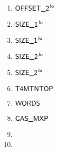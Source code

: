 \begin{description}
\begin{multicols}{3}
\begin{enumerate}
				\item $\textsf{OFFSET}\textsf{\_2}^{\mathsf{\,lo}}$
				\item $\textsf{SIZE}\textsf{\_1}^{\mathsf{\,hi}}$
				\item $\textsf{SIZE}\textsf{\_1}^{\mathsf{\,lo}}$
				\item $\textsf{SIZE}\textsf{\_2}^{\mathsf{\,hi}}$
				\item $\textsf{SIZE}\textsf{\_2}^{\mathsf{\,lo}}$
				\item $\textsf{T4MTNTOP}$
				\item $\textsf{WORDS}$
				\item $\textsf{GAS}\textsf{\_MXP}$
				\item[\vspace{\fill}]
				\item[\vspace{\fill}]
			\end{enumerate}
		\end{multicols}
\end{description}
